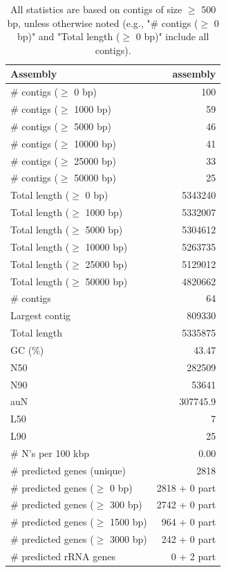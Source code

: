 \documentclass[12pt,a4paper]{article}
\begin{document}
\begin{table}[ht]
\begin{center}
\caption{All statistics are based on contigs of size $\geq$ 500 bp, unless otherwise noted (e.g., "\# contigs ($\geq$ 0 bp)" and "Total length ($\geq$ 0 bp)" include all contigs).}
\begin{tabular}{|l*{1}{|r}|}
\hline
Assembly & assembly \\ \hline
\# contigs ($\geq$ 0 bp) & 100 \\ \hline
\# contigs ($\geq$ 1000 bp) & 59 \\ \hline
\# contigs ($\geq$ 5000 bp) & 46 \\ \hline
\# contigs ($\geq$ 10000 bp) & 41 \\ \hline
\# contigs ($\geq$ 25000 bp) & 33 \\ \hline
\# contigs ($\geq$ 50000 bp) & 25 \\ \hline
Total length ($\geq$ 0 bp) & 5343240 \\ \hline
Total length ($\geq$ 1000 bp) & 5332007 \\ \hline
Total length ($\geq$ 5000 bp) & 5304612 \\ \hline
Total length ($\geq$ 10000 bp) & 5263735 \\ \hline
Total length ($\geq$ 25000 bp) & 5129012 \\ \hline
Total length ($\geq$ 50000 bp) & 4820662 \\ \hline
\# contigs & 64 \\ \hline
Largest contig & 809330 \\ \hline
Total length & 5335875 \\ \hline
GC (\%) & 43.47 \\ \hline
N50 & 282509 \\ \hline
N90 & 53641 \\ \hline
auN & 307745.9 \\ \hline
L50 & 7 \\ \hline
L90 & 25 \\ \hline
\# N's per 100 kbp & 0.00 \\ \hline
\# predicted genes (unique) & 2818 \\ \hline
\# predicted genes ($\geq$ 0 bp) & 2818 + 0 part \\ \hline
\# predicted genes ($\geq$ 300 bp) & 2742 + 0 part \\ \hline
\# predicted genes ($\geq$ 1500 bp) & 964 + 0 part \\ \hline
\# predicted genes ($\geq$ 3000 bp) & 242 + 0 part \\ \hline
\# predicted rRNA genes & 0 + 2 part \\ \hline
\end{tabular}
\end{center}
\end{table}
\end{document}
